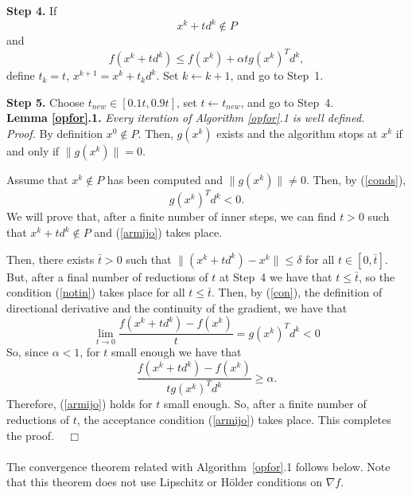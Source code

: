 \documentclass{article}
\newcommand{\halmos}    {\hfill $\;\;\;\Box$\\}
\begin{document}
\noindent
{\bf Step 4.} If 
\begin{equation} \label{notin}
 x^k + t d^k \notin P
\end{equation}
and
\begin{equation} \label{armijo}
f(x^k + t d^k) \leq f(x^k) + \alpha t g(x^k)^T d^k, 
\end{equation}
define $t_k = t$, $x^{k+1} = x^k + t_k d^k$. Set $k \leftarrow k+1$, and go to Step~1. 

\noindent
{\bf Step 5.} Choose $t_{new} \in [0.1 t, 0.9 t]$, set $t \leftarrow t_{new}$, and go to Step~4.\\



\noindent
{\bf Lemma \ref{opfor}.1.} {\it Every iteration of Algorithm \ref{opfor}.1 is well defined.
}\\

\noindent
{\it Proof. } By definition $x^0 \notin P$. Then, $g(x^k)$ exists and the algorithm stops at $x^k$ if and only if
$\|g(x^k)\|=0$. 

Assume that $x^k \notin P$ has been computed and $\|g(x^k)\| \neq 0$. Then, by (\ref{conds}),
\begin{equation} \label{con}
g(x^k)^T d^k < 0.
\end{equation}
We will prove that, after a finite number
of inner steps, we can find $t > 0$ such that $x^k + t d^k \notin P$ and (\ref{armijo}) takes place.


  

Then, there exists $\bar{t} > 0$ such that $\|(x^k + t d^k)-x^k\| \leq \delta$ for all $t \in [0, \bar{t}]$. But, after a final
 number of reductions of $t$ at Step~4 we have that $t \leq \bar{t}$, so the condition (\ref{notin}) takes place for all 
  $t \leq \bar{t}$. Then, by (\ref{con}), the definition of directional derivative and the continuity of the gradient, we have
 that 
\[
\lim_{t \to 0} \frac{f(x^k + t d^k) - f(x^k)}{t} = g(x^k)^T d^k < 0
\]
So, since $\alpha < 1$, for $t$ small enough we have that
\[
\frac{f(x^k + t d^k)-f(x^k)}{t g(x^k)^T d^k} \geq \alpha.
\]
Therefore, (\ref{armijo}) holds for $t$ small enough. So, after a finite number of reductions of $t$, 
  the acceptance condition (\ref{armijo}) takes place.  This completes the proof. \halmos\\

The convergence theorem related with Algorithm~\ref{opfor}.1 follows below. Note that this theorem does not use 
  Lipschitz or H\"older conditions on $\nabla f$.\\ 
\end{document}
